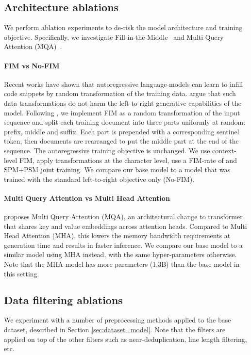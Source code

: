 \documentclass[10pt]{article} \usepackage{iclr2023_conference,times}
\begin{document}
\subsection{Architecture ablations}

We perform ablation experiments to de-risk the model architecture and training objective. Specifically, we investigate Fill-in-the-Middle~\citep{bavarian2022fim} and Multi Query Attention (MQA)~\citep{shazeer2019mqa}.


\paragraph{FIM vs No-FIM}
Recent works \citep{fried2022incoder, bavarian2022fim} have shown that autoregressive language-models can learn to infill code snippets by random transformation of the training data. \citet{bavarian2022fim} argue that such data transformations do not harm the left-to-right generative capabilities of the model. 
Following \citet{bavarian2022fim}, we implement FIM as a random transformation of the input sequence and split each training document into three parts uniformly at random: prefix, middle and suffix.
Each part is prepended with a corresponding sentinel token, then documents are rearranged to put the middle part at the end of the sequence. The autoregressive training objective is unchanged. We use context-level FIM, apply transformations at the character level, use a FIM-rate of  and SPM+PSM joint training. We compare our base model to a model that was trained with the standard left-to-right objective only (No-FIM).


\paragraph{Multi Query Attention vs Multi Head Attention}
\citet{shazeer2019mqa} proposes Multi Query Attention (MQA), an architectural change to transformer that shares key and value embeddings across attention heads. Compared to Multi Head Attention (MHA), this lowers the memory bandwidth requirements at generation time and results in faster inference. We compare our base model to a similar model using MHA instead, with the same hyper-parameters otherwise. Note that the MHA model has more parameters (1.3B) than the base model in this setting. 




\subsection{Data filtering ablations}
We experiment with a number of preprocessing methods applied to the base dataset, described in Section \ref{sec:dataset_model}. Note that the filters are applied on top of the other filters such as near-deduplication, line length filtering, etc.  
\end{document}
